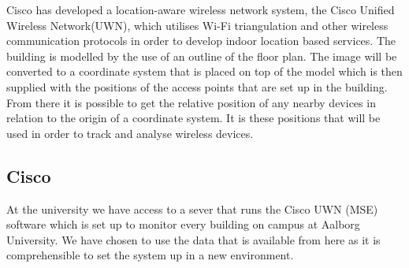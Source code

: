 Cisco has developed a location-aware wireless network system, the Cisco Unified Wireless Network(UWN), which utilises Wi-Fi triangulation\cite{CiscoTri} and other wireless communication protocols in order to develop indoor location based services\cite{uwn}. 
The building is modelled by the use of an outline of the floor plan. The image will be converted to a coordinate system that is placed on top of the model which is then supplied with the positions of the access points that are set up in the building. From there it is possible to get the relative position of any nearby devices in relation to the origin of a coordinate system. It is these positions that will be used in order to track and analyse wireless devices.

\subsection{Cisco}\label{subsec:cisco}
At the university we have access to a sever that runs the Cisco UWN (MSE) software which is set up to monitor every building on campus at Aalborg University. We have chosen to use the data that is available from here as it is comprehensible to set the system up in a new environment.


